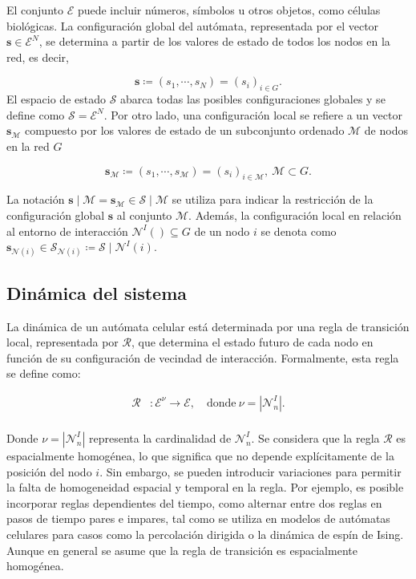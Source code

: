 El conjunto  $\mathcal{E}$ puede incluir números, símbolos u otros objetos, como células biológicas.  La configuración global del autómata, representada por el vector $\mathbf{s} \in  \mathcal{E}^{N}$, se determina a partir de los valores de estado de todos los nodos en la red, es decir,

\begin{equation}\label{eq:44}
\mathbf{s} \coloneqq \left(s_1,\cdots,s_N\right) = \left(s_i\right)_{i\in G}.
\end{equation}
El espacio de estado $\mathcal{S}$  abarca todas las posibles configuraciones globales y se define como  $\mathcal{S} = \mathcal{E}^{N}$.  Por otro lado, una configuración local se refiere a un vector $\mathbf{s}_\mathcal{M}$   compuesto por los valores de estado de un subconjunto ordenado $\mathcal{M}$   de nodos en la red $G$

\begin{equation}\label{eq:45}
\mathbf{s}_\mathcal{M} \coloneqq \left(s_1,\cdots,s_\mathcal{M}\right)=(s_i)_{i\in\mathcal{M}}, \ \mathcal{M} \subset G.
\end{equation}

La notación $\mathbf{s}\mid\mathcal{M}=\mathbf{s}_\mathcal{M}\in\mathcal{S}\mid\mathcal{M}$  se utiliza para indicar la restricción de la configuración global  $\mathbf{s}$ 
al conjunto $\mathcal{M}$.  Además, la configuración local en relación al entorno de interacción  $\mathcal{N}^I( )\subseteq G$ de un nodo  $i$ se denota como $\mathbf{s}_{\mathcal{N}(i)} \in \mathcal{S}_{\mathcal{N}(i)} \coloneqq \mathcal{S}\mid \mathcal{N}^I(i)$.

\subsection{Dinámica del sistema}\label{sec:dinamica_automata}

La dinámica de un autómata celular está determinada por una regla de transición local, representada por $\mathcal{R}$, que determina el estado futuro de cada nodo en función de su configuración de vecindad de interacción. Formalmente, esta regla se define como:


\begin{align}\label{eq:46}
	\mathcal{R}&:\mathcal{E}^\nu\rightarrow\mathcal{E}, \quad \text{donde} \  \nu = \left| \mathcal{N}_n^I\right|.\\
\end{align}


Donde $ \nu = \left| \mathcal{N}_n^I\right|$ representa la cardinalidad de $\mathcal{N}_n^I$. Se considera que la regla $\mathcal{R}$  es espacialmente homogénea, lo que significa que no depende explícitamente de la posición del nodo $i$. Sin embargo, se pueden introducir variaciones para permitir la falta de homogeneidad espacial y temporal en la regla. Por ejemplo, es posible incorporar reglas dependientes del tiempo, como alternar entre dos reglas en pasos de tiempo pares e impares, tal como se utiliza en modelos de autómatas celulares para casos como la percolación dirigida o la dinámica de espín de Ising. Aunque en general se asume que la regla de transición es espacialmente homogénea.


